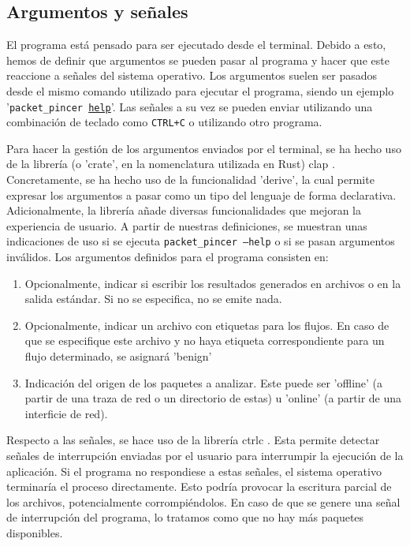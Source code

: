 \subsection{Argumentos y señales}

El programa está pensado para ser ejecutado desde el terminal. Debido a esto, hemos de definir que argumentos se pueden pasar al programa y hacer que este reaccione a señales del sistema operativo. Los argumentos suelen ser pasados desde el mismo comando utilizado para ejecutar el programa, siendo un ejemplo '\texttt{packet\_pincer \underline{help}}'. Las señales a su vez se pueden enviar utilizando una combinación de teclado como \texttt{CTRL+C} o utilizando otro programa.

Para hacer la gestión de los argumentos enviados por el terminal, se ha hecho uso de la librería (o 'crate', en la nomenclatura utilizada en Rust) clap \cite{Knapp_clap_2024}. Concretamente, se ha hecho uso de la funcionalidad 'derive', la cual permite expresar los argumentos a pasar como un tipo del lenguaje de forma declarativa. Adicionalmente, la librería añade diversas funcionalidades que mejoran la experiencia de usuario. A partir de nuestras definiciones, se muestran unas indicaciones de uso si se ejecuta \texttt{packet\_pincer --help} o si se pasan argumentos inválidos. Los argumentos definidos para el programa consisten en:

\begin{enumerate}
  \item Opcionalmente, indicar si escribir los resultados generados en archivos o en la salida estándar. Si no se especifica, no se emite nada.
  \item Opcionalmente, indicar un archivo con etiquetas para los flujos. En caso de que se especifique este archivo y no haya etiqueta correspondiente para un flujo determinado, se asignará 'benign'
  \item Indicación del origen de los paquetes a analizar. Este puede ser 'offline' (a partir de una traza de red o un directorio de estas) u 'online' (a partir de una interficie de red).
\end{enumerate}

Respecto a las señales, se hace uso de la librería ctrlc \cite{controlc}. Esta permite detectar señales de interrupción enviadas por el usuario para interrumpir la ejecución de la aplicación. Si el programa no respondiese a estas señales, el sistema operativo terminaría el proceso directamente. Esto podría provocar la escritura parcial de los archivos, potencialmente corrompiéndolos. En caso de que se genere una señal de interrupción del programa, lo tratamos como que no hay más paquetes disponibles.

